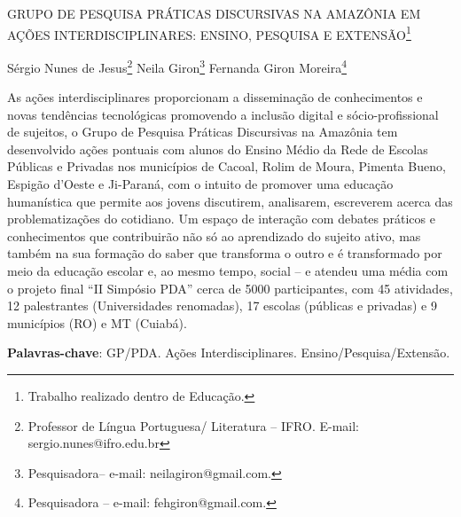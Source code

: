 \documentclass[article,12pt,onesidea,4paper,english,brazil]{abntex2}
\begin{document}
	
	
	\frenchspacing 
	
	\begin{center}
		\LARGE GRUPO DE PESQUISA PRÁTICAS DISCURSIVAS NA AMAZÔNIA EM AÇÕES INTERDISCIPLINARES: ENSINO, PESQUISA E EXTENSÃO\footnote{Trabalho realizado dentro de Educação.}
		
		\normalsize
		Sérgio Nunes de Jesus\footnote{Professor de Língua Portuguesa/ Literatura – IFRO. E-mail: sergio.nunes@ifro.edu.br} 
		Neila Giron\footnote{Pesquisadora– e-mail: neilagiron@gmail.com.} 
		Fernanda Giron Moreira\footnote{Pesquisadora – e-mail: fehgiron@gmail.com.} 
	\end{center}
	
	\noindent As ações interdisciplinares proporcionam a disseminação de conhecimentos e novas tendências tecnológicas promovendo a inclusão digital e sócio-profissional de sujeitos, o Grupo de Pesquisa Práticas Discursivas na Amazônia tem desenvolvido ações pontuais com alunos do Ensino Médio da Rede de Escolas Públicas e Privadas nos municípios de Cacoal, Rolim de Moura, Pimenta Bueno, Espigão d’Oeste e Ji-Paraná, com o intuito de promover uma educação humanística que permite aos jovens discutirem, analisarem, escreverem acerca das problematizações do cotidiano. Um espaço de interação com debates práticos e conhecimentos que contribuirão não só ao aprendizado do sujeito ativo, mas também na sua formação do saber que transforma o outro e é transformado por meio da educação escolar e, ao mesmo tempo, social – e atendeu uma média com o projeto final “II Simpósio PDA” cerca de 5000 participantes, com 45 atividades, 12 palestrantes (Universidades renomadas), 17 escolas (públicas e privadas) e 9 municípios (RO) e MT (Cuiabá).
	
	\vspace{\onelineskip}
	
	\noindent
	\textbf{Palavras-chave}: GP/PDA. Ações Interdisciplinares. Ensino/Pesquisa/Extensão.
	
\end{document}
